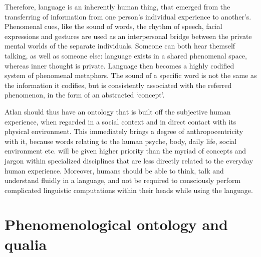 Therefore, language is an inherently human thing, that emerged from the transferring of information from one person’s individual experience to another’s. Phenomenal cues, like the sound of words, the rhythm of speech, facial expressions and gestures are used as an interpersonal bridge between the private mental worlds of the separate individuals. Someone can both hear themself talking, as well as someone else: language exists in a shared phenomenal space, whereas inner thought is private. Language then becomes a highly codified system of phenomenal metaphors. The sound of a specific word is not the same as the information it codifies, but is consistently associated with the referred phenomenon, in the form of an abstracted ‘concept’. 

Atlan should thus have an ontology that is built off the subjective human experience, when regarded in a social context and in direct contact with its physical environment. This immediately brings a degree of anthropocentricity with it, because words relating to the human psyche, body, daily life, social environment etc. will be given higher priority than the myriad of concepts and jargon within specialized disciplines that are less directly related to the everyday human experience. Moreover, humans should be able to think, talk and understand fluidly in a language, and not be required to consciously perform complicated linguistic computations within their heads while using the language. 

 

\section{Phenomenological ontology and qualia} 

